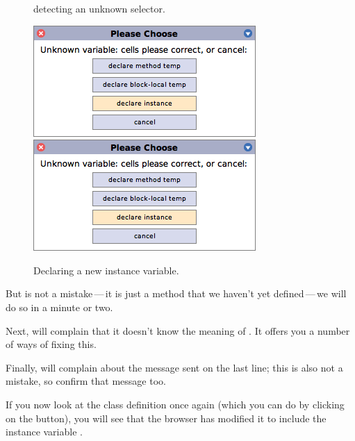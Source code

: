 \documentclass[a4paper,10pt,twoside]{book}
\begin{document}
\begin{figure}[htb]
\begin{minipage}{0.34\textwidth}
	\caption{\squeak detecting an unknown selector.\label{fig:unknownSelector}}
\end{minipage}
\hfill
\begin{minipage}{0.64\textwidth}
	\centering
	\ifluluelse
		{\includegraphics[width=\textwidth]{DeclareInstanceVar}}
		{\includegraphics[scale=0.7]{DeclareInstanceVar}}
	\caption{Declaring a new instance variable.\label{fig:declareInstance}}
\end{minipage}
\end{figure}

But  is not a mistake\,---\,it is just a method that we haven't yet defined\,---\,we will do so in a minute or two.


Next, \squeak will complain that it doesn't know the meaning of .  It offers you a number of ways of fixing this.

Finally, \squeak will complain about the message  sent on the last line; this is also not a mistake, so confirm that message too.

If you now look at the class definition once again (which you can do by clicking on the  button), you will see that the browser has modified it to include the instance variable .
\end{document}
